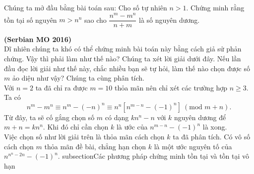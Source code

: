 Chúng ta mở đầu bằng bài toán sau: Cho số tự nhiên $n>1$. Chứng minh rằng tồn tại số nguyên $m>n^n$ sao cho $\dfrac{n^m -m^n}{n+m}$ là số nguyên dương. 

\hfill \textbf{(Serbian MO 2016)} \\
Dĩ nhiên chúng ta khó có thể chứng minh bài toán này bằng cách giả sử phản chứng. Vậy thì phải làm như thế nào? Chúng ta xét lời giải dưới đây.
Nếu lần đầu đọc lời giải như thế này, chắc nhiều bạn sẽ tự hỏi, làm thế nào chọn được số $m$ ảo diệu như vậy? Chúng ta cùng phân tích. \\
Với $n=2$ ta đã chỉ ra được $m=10$ thỏa mãn nên chỉ xét các trường hợp $n \geqslant 3$. Ta có 
\[n^m-m^n \equiv n^m - (-n)^n \equiv n^n [n^{m-n}-(-1)^n] ~ (\textrm{mod } m+n).\]
Từ đây, ta sẽ cố gắng chọn số $m$ có dạng $kn^n-n$ với $k$ nguyên dương để $m+n=kn^n$. Khi đó chỉ cần chọn $k$ là ước của $n^{m-n}-(-1)^n$ là xong.\\
Việc chọn số như lời giải trên là thỏa mãn cách chọn $k$ ta đã phân tích. Có vô số cách chọn $m$ thỏa mãn đề bài, chẳng hạn chọn $k$ là một ước nguyên tố của $n^{n^n-2n}-(-1)^n$.
subsection{Các phương pháp chứng minh tồn tại và tồn tại vô hạn}
